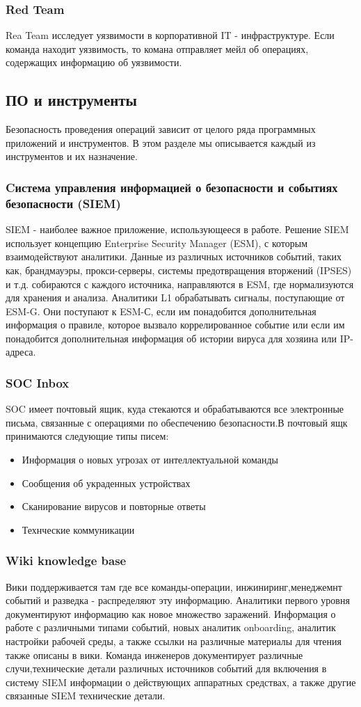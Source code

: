 \documentclass[12pt,]{article}
\begin{document}
\subsubsection{Red Team}
Rea Team исследует уязвимости в корпоративной IT - инфраструктуре. Если команда находит  уязвимость, то комана отправляет мейл об операциях, содержащих информацию об уязвимости.
\subsection{ПО и инструменты}
Безопасность проведения операций зависит от целого ряда программных приложений и инструментов. В этом разделе мы описывается каждый из инструментов и их назначение.
\subsubsection{Cистема управления информацией о безопасности и событиях безопасности (SIEM)}
SIEM  - наиболее важное приложение, использующееся в работе. Решение SIEM использует концепцию Enterprise Security Manager (ESM), с которым взаимодействуют аналитики. Данные из различных источников событий, таких как, брандмауэры, прокси-серверы, системы предотвращения вторжений (IPSES) и т.д. собираются с каждого источника, направляются в ESM, где нормализуются для хранения и анализа. Аналитики L1 обрабатывать сигналы, поступающие от ESM-G. Они поступают к ESM-С, если им понадобится дополнительная информация о правиле, которое вызвало коррелированное событие или если им понадобится дополнительная информация об истории вируса для хозяина или IP-адреса.
\subsubsection{SOC Inbox}
SOC имеет почтовый ящик, куда стекаются и обрабатываются все электронные письма, связанные с операциями по обеспечению безопасности.В почтовый ящк принимаются следующие типы писем:
\begin{itemize}
\item Информация о новых угрозах от интеллектуальной команды
\item Сообщения об украденных устройствах
\item Сканирование вирусов и повторные ответы
\item Технческие коммуникации
\end{itemize}
\subsubsection{Wiki knowledge base}
Вики поддерживается там где все команды-операции, инжиниринг,менеджемнт событий и разведка - распределяют эту информацию. Аналитики первого уровня документируют информацию как новое множество заражений.
Информация о работе с различными типами событий, новых аналитик onboarding, аналитик настройки рабочей среды, а также ссылки на различные материалы для чтения также описаны в вики. Команда инженеров документирует различные случи,технические детали различных источников событий для включения в систему SIEM информации о действующих аппаратных средствах, а также другие связанные SIEM технические детали.
\end{document}
